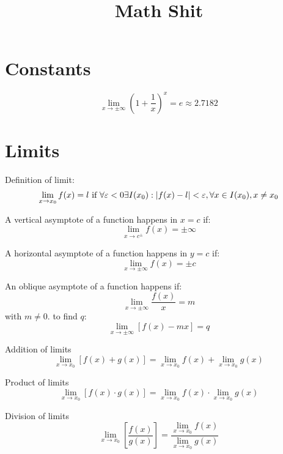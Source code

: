 \documentclass{article}
\begin{document}
\title{Math Shit}
\boldmath

\section{Constants}

\begin{equation}
\lim_{x\to\pm\infty}(1+\frac{1}{x})^x=e\approx2.7182
\end{equation}

\section{Limits}

Definition of limit:
\begin{equation}
\lim_{x\to{x_0}}f(x) = l \textnormal{ if } \forall\varepsilon<0\exists I(x_0): |f(x) - l| < \varepsilon, \forall x \in I(x_0), x\neq x_0
\end{equation}

A vertical asymptote of a function happens in $x = c$ if:
\begin{equation}
\lim_{x\to{c^\pm}} f(x) = \pm\infty
\end{equation}

A horizontal asymptote of a function happens in $y = c$ if:
\begin{equation}
\lim_{x\to{\pm\infty}} f(x) = \pm c
\end{equation}

An oblique asymptote of a function happens if:
\begin{equation}
\lim_{x\to{\pm\infty}} \frac{f(x)}{x} = m
\end{equation}
with $m \neq 0$.
to find $q$: 
\begin{equation}
\lim_{x\to{\pm\infty}} [f(x) - mx] = q
\end{equation}

Addition of limits
\begin{equation}
\lim_{x\to{x_0}} [f(x) + g(x)] = \lim_{x\to{x_0}} f(x) + \lim_{x\to{x_0}} g(x)
\end{equation}

Product of limits
\begin{equation}
\lim_{x\to{x_0}} [f(x) \cdot g(x)] = \lim_{x\to{x_0}} f(x) \cdot \lim_{x\to{x_0}} g(x)
\end{equation}

Division of limits
\begin{equation}
\lim_{x\to{x_0}} [\frac{f(x)}{g(x)}] = \frac{\lim_{x\to{x_0}} f(x)}{\lim_{x\to{x_0}} g(x)}
\end{equation}
\end{document}
